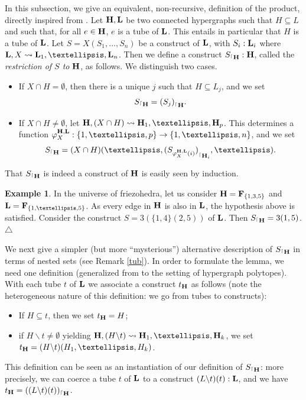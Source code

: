 \documentclass[11pt]{article}
\theoremstyle{definition}
\newtheorem{example}[theo]{Example}
\numberwithin{equation}{section}
\numberwithin{equation}{section}
\newcommand\xqed[1]{%
  \leavevmode\unskip\penalty9999 \hbox{}\nobreak\hfill
  \quad\hbox{#1}}
\newcommand\demo{\xqed{$\triangle$}}
\newcommand{\inc}{\subseteq}
\newcommand{\set}[1]{\{#1\}}
\newcommand{\hyper}[1]{{\bf #1}}
\newcommand{\restrconstr}[2]{{#1}_{{}^\lceil {#2}}}
\begin{document}
In this subsection, we give an equivalent, non-recursive, definition of the product, directly inspired from \cite{RoncoGTO}. 
 Let $\hyper{H},\hyper{L}$ be two connected hypergraphs such that $H\inc L$ and such that, for all $e\in\hyper{H}$, $e$ is a tube of  $\hyper{L}$. This entails in particular that $H$ is a tube of  $\hyper{L}$. Let $S=X(S_1,\ldots,S_n)$  be a construct of $\hyper{L}$, with $S_i:\hyper{L}_i$ where $\hyper{L},X\leadsto\hyper{L}_1,\ldots,\hyper{L}_n$. Then we define a construct $\restrconstr{S}{\hyper{H}}:\hyper{H}$, called the {\em restriction of $S$ to} $\hyper{H}$, as follows. We distinguish two cases.
\begin{itemize}
\item
If $X\cap H=\emptyset$, then there is a unique $j$ such that
$H\inc L_j$, and we set $$\restrconstr{S}{\hyper{H}}=\restrconstr{(S_j)}{\hyper{H}}.$$
\item
If $X\cap H\neq\emptyset$, let $\hyper{H},(X\cap H)\leadsto \hyper{H}_1,\ldots,\hyper{H}_p$. This determines a function $\varphi_X^{\hyper{H},\hyper{L}}:\set{1,\ldots,p}\rightarrow\set{1,\ldots,n}$, and we set  $$\restrconstr{S}{\hyper{H}}=(X\cap H)(\ldots,\restrconstr{(S_{\varphi_X^{\hyper{H},\hyper{L}}(i)})}{\hyper{H}_i},\ldots).$$
\end{itemize}
That  $\restrconstr{S}{\hyper{H}}$ is indeed a construct of $\hyper{H}$ is easily seen by induction.   

\begin{example} \label{4.19} In the universe of friezohedra, let us consider $\hyper{H}=\hyper{F}_{\{1, 3, 5\}}$ and $\hyper{L}=\hyper{F}_{\{1, \ldots, 5\}}$. As every edge in $\hyper{H}$ is also in $\hyper{L}$, the hypothesis above is satisfied. Consider the construct $S=3(\{1,4\}(2,5))$ of $\hyper{L}$. Then $\restrconstr{S}{\hyper{H}}=3(1,5)$. \demo
\end{example}

We next give a simpler (but more ``mysterious'')  alternative description of  $\restrconstr{S}{\hyper{H}}$ in terms of nested sets (see Remark \ref{tub}). In order to formulate the lemma, we need one definition (generalized from \cite{RoncoGTO} to the setting of hypergraph polytopes). With each tube $t$  of $\hyper{L}$ we associate a construct $t_{\hyper{H}}$ as follows (note the heterogeneous nature of this definition: we go from tubes to constructs):
\begin{itemize}
\item If $H\inc t$, then we set $t_{\hyper{H}}=H$;
\item if $H\backslash t\neq\emptyset$ yielding $\hyper{H},(H\backslash t)\leadsto \hyper{H}_1,\ldots,\hyper{H}_k$, we set $t_{\hyper{H}}=(H\backslash t)(H_1,\ldots,H_k)$. 
\end{itemize}
This definition can be seen as an instantiation of our definition of $\restrconstr{S}{\hyper{H}}$: more precisely, we can coerce a tube $t$ of $\hyper{L}$ to a construct  $(L\backslash t)(t):\hyper{L}$, and we have 
$t_{\hyper{H}} = \restrconstr{((L\backslash t)(t))}{\hyper{H}}$.
\end{document}
